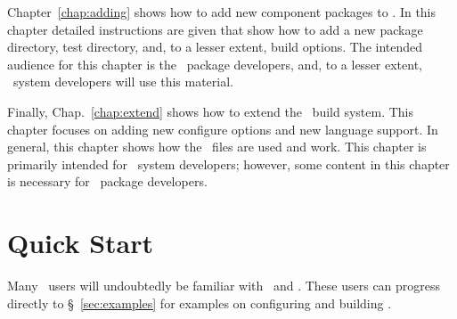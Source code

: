 Chapter~\ref{chap:adding} shows how to add new component packages to
\draco.  In this chapter detailed instructions are given that show how
to add a new package directory, test directory, and, to a lesser
extent, build options.  The intended audience for this chapter is the
\draco\ package developers, and, to a lesser extent, \draco\ system
developers will use this material.

Finally, Chap.~\ref{chap:extend} shows how to extend the \draco\ build 
system.  This chapter focuses on adding new configure options and new
language support.  %
In general, this chapter shows how the \cmake\ files are used and work.
 This chapter is primarily intended
for \draco\ system developers; however, some content in this chapter
is necessary for \draco\ package developers.


\section{Quick Start}
\label{sec:quick}

Many \draco\ users will undoubtedly be familiar with \cmake\ and
\make. These users can progress directly to \S~\ref{sec:examples} for 
examples on configuring and building \draco. 

